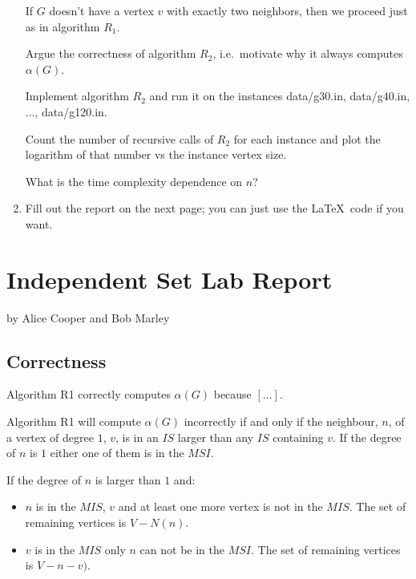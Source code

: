 \documentclass{tufte-handout}
\begin{document}
\begin{enumerate}
  If $G$ doesn't have a vertex $v$ with exactly two neighbors, then we
  proceed just as in algorithm $R_1$.
 
 Argue the correctness of algorithm $R_2$, i.e.\ motivate why it always computes $\alpha(G)$.
 
 Implement algorithm $R_2$ and run it on the instances
  data/g30.in, data/g40.in, $\ldots$, data/g120.in.

  Count the number of recursive calls of $R_2$ for each instance and plot the
  logarithm of that number vs the instance vertex size. 
  
  What is the time complexity dependence on $n$?

\item Fill out the report on the next page; you can just use the
  \LaTeX\ code if you want.
\end{enumerate}

\newpage


\newpage
\section{Independent Set Lab Report}


by Alice Cooper and Bob Marley

\subsection{Correctness}
Algorithm R1 correctly computes $\alpha(G)$ because $[\ldots]$.

Algorithm R1 will compute $\alpha(G)$ incorrectly if and only if the neighbour,
$n$, of a vertex of degree $1$, $v$, is in an $IS$ larger than any $IS$ containing $v$.
If the degree of $n$ is $1$ either one of them is in the $MSI$.

If the degree of $n$ is larger than $1$ and:
\begin{itemize}
	\item $n$ is in the $MIS$, $v$ and at least one more vertex is not in the
		$MIS$. The set of remaining vertices is $V - N(n)$.
	\item $v$ is in the $MIS$ only $n$ can not be in the $MSI$. The set of
		remaining vertices is $V - n - v)$.
\end{itemize}
\end{document}
